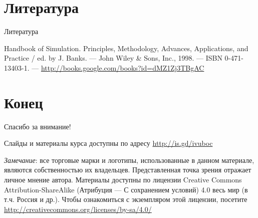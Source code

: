 \documentclass{beamer}
\begin{document}
\section{Литература}

\begin{frame}[allowframebreaks]{Литература}
\begin{thebibliography}{99}
     Handbook of Simulation. Principles, Methodology, Advances, Applications, and Practice / ed. by J. Banks. — John Wiley \& Sons, Inc., 1998. — ISBN 0-471-13403-1. — \url{http://books.google.com/books?id=dMZ1Zj3TBgAC} %
\end{thebibliography}
\end{frame}


\section{Конец}
\begin{frame}

{\huge{Спасибо за внимание!}\par}

\vfill

Слайды и материалы курса доступны по адресу \url{http://is.gd/ivuboc} %

\vfill

\tiny{\textit{Замечание}: все торговые марки и логотипы, использованные в данном материале, являются собственностью их владельцев. Представленная точка зрения отражает личное мнение автора.
Материалы доступны по лицензии Creative Commons Attribution-ShareAlike (Атрибуция — С сохранением условий) 4.0 весь мир (в т.ч. Россия и др.). Чтобы ознакомиться с экземпляром этой лицензии, посетите \url{http://creativecommons.org/licenses/by-sa/4.0/}
}

\end{frame}
\end{document}
